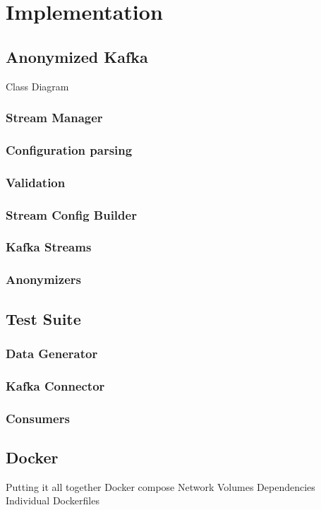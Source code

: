 \chapter{Implementation\label{cha:chapter5}}

\section{Anonymized Kafka}
Class Diagram
\subsection{Stream Manager}
\subsection{Configuration parsing}
\subsection{Validation}
\subsection{Stream Config Builder}
\subsection{Kafka Streams}
\subsection{Anonymizers}

\section{Test Suite}
\subsection{Data Generator}
\subsection{Kafka Connector}
\subsection{Consumers}

\section{Docker}
Putting it all together
Docker compose 
Network 
Volumes
Dependencies
Individual Dockerfiles

